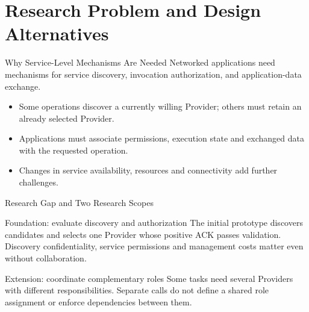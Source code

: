 \begin{frame}[plain]\titlepage\end{frame}

\section{Research Problem and Design Alternatives}
\begin{frame}{Why Service-Level Mechanisms Are Needed}
Networked applications need mechanisms for service discovery, invocation authorization, and application-data exchange.
\vspace{3mm}
\begin{itemize}
\item Some operations discover a currently willing Provider; others must retain an already selected Provider.
\item Applications must associate permissions, execution state and exchanged data with the requested operation.
\item Changes in service availability, resources and connectivity add further challenges.
\end{itemize}
\vspace{3mm}
\end{frame}

\begin{frame}{Research Gap and Two Research Scopes}
\begin{block}{Foundation: evaluate discovery and authorization}
The initial prototype discovers candidates and selects one Provider whose positive ACK passes validation. Discovery confidentiality, service permissions and management costs matter even without collaboration.
\end{block}
\begin{block}{Extension: coordinate complementary roles}
Some tasks need several Providers with different responsibilities. Separate calls do not define a shared role assignment or enforce dependencies between them.
\end{block}
\vspace{3mm}
\end{frame}

